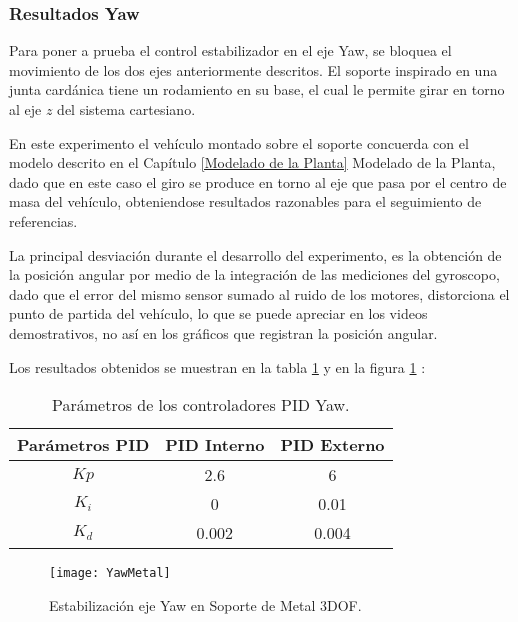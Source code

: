 \documentclass[../main.tex]{subfiles}
\begin{document}
\subsubsection{Resultados Yaw}

Para poner a prueba el control estabilizador en el eje Yaw, se bloquea
el movimiento de los dos ejes anteriormente descritos. El soporte
inspirado en una junta cardánica tiene un rodamiento en su base, el
cual le permite girar en torno al eje $z$ del sistema cartesiano. 

En este experimento el vehículo montado sobre el soporte concuerda
con el modelo descrito en el Capítulo \ref{Modelado de la Planta} Modelado de la Planta, dado que en este caso el giro
se produce en torno al eje que pasa por el centro de masa del vehículo,
obteniendose resultados razonables para el seguimiento de referencias. 

La principal desviación durante el desarrollo del experimento, es
la obtención de la posición angular por medio de la integración de
las mediciones del gyroscopo, dado que el error del mismo sensor sumado
al ruido de los motores, distorciona el punto de partida del vehículo,
lo que se puede apreciar en los videos demostrativos, no así en los
gráficos que registran la posición angular.

Los resultados obtenidos se muestran en la tabla \ref{table: Parametros Yaw Me} y en la figura \ref{fig: Resultados Yaw Me} :

\begin{table}[H]
\noindent \begin{centering}
\begin{tabular}{|c|c|c|}
\hline 
Parámetros PID & PID Interno & PID Externo\tabularnewline
\hline 
\hline 
$Kp$ & 2.6 & 6\tabularnewline
\hline 
$K_{i}$ & 0 & 0.01\tabularnewline
\hline 
$K_{d}$ & 0.002 & 0.004\tabularnewline
\hline 
\end{tabular}
\par\end{centering}
\caption{Parámetros de los controladores PID Yaw.}\label{table: Parametros Yaw Me}\noindent
\end{table}

\begin{figure}[H]
\noindent \begin{centering}
\texttt{[image: YawMetal]}
\par\end{centering}
\caption{Estabilización eje Yaw en Soporte de Metal 3DOF.}\label{fig: Resultados Yaw Me}\noindent
\end{figure}
\end{document}
